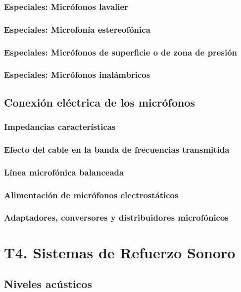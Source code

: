 \documentclass[a4paper, 8pt]{extarticle}
\begin{document}
\begin{multicols}{3}
  \subsubsection{Especiales: Micrófonos lavalier}
  \subsubsection{Especiales: Microfonía estereofónica}
  \subsubsection{Especiales: Micrófonos de superficie o de zona de presión}
  \subsubsection{Especiales: Micrófonos inalámbricos}

  \subsection{Conexión eléctrica de los micrófonos}
  \subsubsection{Impedancias características}
  \subsubsection{Efecto del cable en la banda de frecuencias transmitida}
  \subsubsection{Línea microfónica balanceada}
  \subsubsection{Alimentación de micrófonos electrostáticos}
  \subsubsection{Adaptadores, conversores y distribuidores microfónicos}

  \newpage
  \section{T4. Sistemas de Refuerzo Sonoro}

  \subsection{Niveles acústicos}

\end{multicols}
\end{document}
